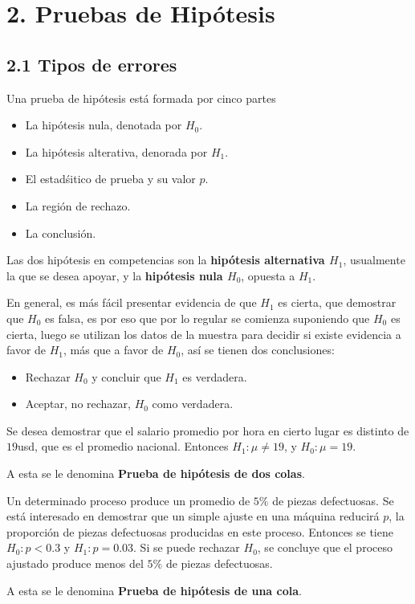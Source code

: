 \section{2. Pruebas de Hip\'otesis}
\subsection{2.1 Tipos de errores}

\begin{frame}
Una prueba de hip\'otesis est\'a formada por cinco partes
\begin{itemize}
\item La hip\'otesis nula, denotada por $H_{0}$.
\item La hip\'otesis alterativa, denorada por $H_{1}$.
\item El estad\'sitico de prueba y su valor $p$.
\item La regi\'on de rechazo.
\item La conclusi\'on.

\end{itemize}

\begin{Def}
Las dos hip\'otesis en competencias son la \textbf{hip\'otesis alternativa $H_{1}$}, usualmente la que se desea apoyar, y la \textbf{hip\'otesis nula $H_{0}$}, opuesta a $H_{1}$.
\end{Def}

En general, es m\'as f\'acil presentar evidencia de que $H_{1}$ es cierta, que demostrar 	que $H_{0}$ es falsa, es por eso que por lo regular se comienza suponiendo que $H_{0}$ es cierta, luego se utilizan los datos de la muestra para decidir si existe evidencia a favor de $H_{1}$, m\'as que a favor de $H_{0}$, as\'i se tienen dos conclusiones:
\begin{itemize}
\item Rechazar $H_{0}$ y concluir que $H_{1}$ es verdadera.
\item Aceptar, no rechazar, $H_{0}$ como verdadera.

\end{itemize}
\begin{Ejem}
Se desea demostrar que el salario promedio  por hora en cierto lugar es distinto de $19$usd, que es el promedio nacional. Entonces $H_{1}:\mu\neq19$, y $H_{0}:\mu=19$.
\end{Ejem}
A esta se le denomina \textbf{Prueba de hip\'otesis de dos colas}.


\begin{Ejem}
Un determinado proceso produce un promedio de $5\%$ de piezas defectuosas. Se est\'a interesado en demostrar que un simple ajuste en una m\'aquina reducir\'a $p$, la proporci\'on de piezas defectuosas producidas en este proceso. Entonces se tiene $H_{0}:p<0.3$ y $H_{1}:p=0.03$. Si se puede rechazar $H_{0}$, se concluye que el proceso ajustado produce menos del $5\%$ de piezas defectuosas.
\end{Ejem}
A esta se le denomina \textbf{Prueba de hip\'otesis de una cola}.


\end{frame}
